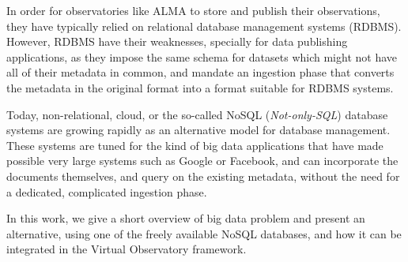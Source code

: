 In order for observatories like ALMA to store and publish their observations, they have typically relied on relational database management systems (RDBMS). However, RDBMS have their weaknesses, specially for data publishing applications, as they impose the same schema for datasets which might not have all of their metadata in common, and mandate an ingestion phase that converts the metadata in the original format into a format suitable for RDBMS systems.

Today, non-relational, cloud, or the so-called NoSQL (\emph{Not-only-SQL}) database systems
are growing rapidly as an alternative model for database management. These systems are tuned for the kind of big data applications that have made possible very large systems such as Google or Facebook, and can incorporate the documents themselves, and query on the existing metadata, without the need for a dedicated, complicated ingestion phase.


In this work, we give a short overview of big data problem and present an alternative, using one of the
freely available %
NoSQL databases, 
and how it can be integrated in the Virtual Observatory framework.